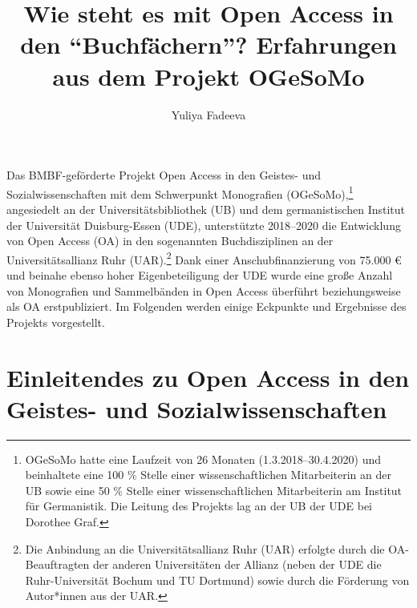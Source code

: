 \documentclass[a4paper,
fontsize=11pt,
oneside,
numbers=noperiodatend,
parskip=half-,
bibliography=totoc,
final
]{scrartcl}
\title{\LARGE{Wie steht es mit Open Access in den \enquote{Buchfächern}? Erfahrungen aus dem Projekt OGeSoMo}}%
\author{Yuliya Fadeeva} %
\date{}
\begin{document}
\maketitle
\thispagestyle{fancyplain} 


Das BMBF-geförderte Projekt Open Access in den
Geistes- und Sozialwissenschaften mit dem Schwerpunkt
Monografien (OGeSoMo),\footnote{OGeSoMo hatte eine Laufzeit von
  26 Monaten (1.3.2018--30.4.2020) und beinhaltete eine 100 \% Stelle
  einer wissenschaftlichen Mitarbeiterin an der UB sowie eine 50 \%
  Stelle einer wissenschaftlichen Mitarbeiterin am Institut für
  Germanistik. Die Leitung des Projekts lag an der UB der UDE bei
  Dorothee Graf.} angesiedelt an der Universitätsbibliothek (UB) und dem
germanistischen Institut der Universität Duisburg-Essen (UDE),
unterstützte 2018--2020 die Entwicklung von Open Access (OA) in den
sogenannten Buchdisziplinen an der Universitätsallianz Ruhr
(UAR).\footnote{Die Anbindung an die Universitätsallianz Ruhr (UAR)
  erfolgte durch die OA-Beauftragten der anderen Universitäten der
  Allianz (neben der UDE die Ruhr-Universität Bochum und TU Dortmund)
  sowie durch die Förderung von Autor*innen aus der UAR.} Dank einer
Anschubfinanzierung von 75.000 € und beinahe ebenso hoher
Eigenbeteiligung der UDE wurde eine große Anzahl von Monografien und
Sammelbänden in Open Access überführt beziehungsweise als OA
erstpubliziert. Im Folgenden werden einige Eckpunkte und Ergebnisse des
Projekts vorgestellt.

\hypertarget{einleitendes-zu-open-access-in-den-geistes--und-sozialwissenschaften}{%
\section{Einleitendes zu Open Access in den Geistes- und
Sozialwissenschaften}\label{einleitendes-zu-open-access-in-den-geistes--und-sozialwissenschaften}}
\end{document}
